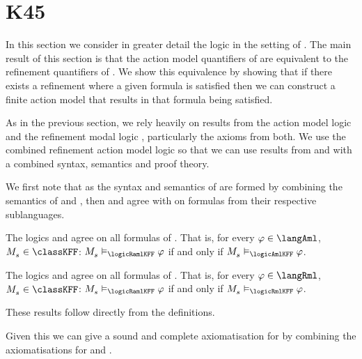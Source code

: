 \section{K45}\label{aaml-kd45}

In this section we consider in greater detail the logic \logicAamlKFF{} in the setting of \classKFF{}.
The main result of this section is that the action model quantifiers of \logicAamlKFF{} are equivalent to the refinement quantifiers of \logicRmlKFF{}.
We show this equivalence by showing that if there exists a refinement where a given formula is satisfied then we can construct a finite action model that results in that formula being satisfied.

As in the previous section, we rely heavily on results from the action model logic \logicAmlKFF{} and the refinement modal logic \logicRmlKFF{}, particularly the axioms from both.
We use the combined refinement action model logic \logicRamlKFF{} so that we can use results from \logicAmlKFF{} and \logicRmlKFF{} with a combined syntax, semantics and proof theory.

We first note that as the syntax and semantics of \logicRamlKFF{} are formed by combining the semantics of \logicAmlKFF{} and \logicRmlKFF{}, then \logicAmlKFF{} and \logicRmlKFF{} agree with \logicRamlKFF{} on formulas from their respective sublanguages.

\begin{lemma}\label{raml-k45-aml}
The logics \logicRamlKFF{} and \logicAmlKFF{} agree on all formulas of \langAml{}.
That is, for every $\phi \in \langAml$, $\kPModel{\kStateS} \in \classKFF$: $\kPModel{\kStateS} \entails_\logicRamlKFF \phi$ if and only if $\kPModel{\kStateS} \entails_\logicAmlKFF \phi$.
\end{lemma}

\begin{lemma}\label{raml-k45-rml}
The logics \logicRamlKFF{} and \logicAmlKFF{} agree on all formulas of \langRml{}.
That is, for every $\phi \in \langRml$, $\kPModel{\kStateS} \in \classKFF$: $\kPModel{\kStateS} \entails_\logicRamlKFF \phi$ if and only if $\kPModel{\kStateS} \entails_\logicRmlKFF \phi$.
\end{lemma}

These results follow directly from the definitions.

Given this we can give a sound and complete axiomatisation for \logicRamlKFF{} by combining the axiomatisations for \logicAmlKFF{} and \logicRmlKFF{}.

